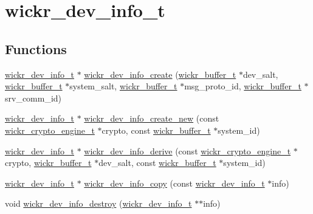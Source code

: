 \hypertarget{group__wickr__dev__info}{}\section{wickr\+\_\+dev\+\_\+info\+\_\+t}
\label{group__wickr__dev__info}
\subsection*{Functions}
\begin{DoxyCompactItemize}
\item 
\hyperlink{structwickr__dev__info}{wickr\+\_\+dev\+\_\+info\+\_\+t} $\ast$ \hyperlink{group__wickr__dev__info_gaadd5ceb4c6ed757440332e8e27109e5e}{wickr\+\_\+dev\+\_\+info\+\_\+create} (\hyperlink{structwickr__buffer}{wickr\+\_\+buffer\+\_\+t} $\ast$dev\+\_\+salt, \hyperlink{structwickr__buffer}{wickr\+\_\+buffer\+\_\+t} $\ast$system\+\_\+salt, \hyperlink{structwickr__buffer}{wickr\+\_\+buffer\+\_\+t} $\ast$msg\+\_\+proto\+\_\+id, \hyperlink{structwickr__buffer}{wickr\+\_\+buffer\+\_\+t} $\ast$srv\+\_\+comm\+\_\+id)
\item 
\hyperlink{structwickr__dev__info}{wickr\+\_\+dev\+\_\+info\+\_\+t} $\ast$ \hyperlink{group__wickr__dev__info_gadbe4731cffb188da317ed9237826ac5d}{wickr\+\_\+dev\+\_\+info\+\_\+create\+\_\+new} (const \hyperlink{structwickr__crypto__engine}{wickr\+\_\+crypto\+\_\+engine\+\_\+t} $\ast$crypto, const \hyperlink{structwickr__buffer}{wickr\+\_\+buffer\+\_\+t} $\ast$system\+\_\+id)
\item 
\hyperlink{structwickr__dev__info}{wickr\+\_\+dev\+\_\+info\+\_\+t} $\ast$ \hyperlink{group__wickr__dev__info_ga7f81b96fc222560762d608772b3f44bd}{wickr\+\_\+dev\+\_\+info\+\_\+derive} (const \hyperlink{structwickr__crypto__engine}{wickr\+\_\+crypto\+\_\+engine\+\_\+t} $\ast$crypto, \hyperlink{structwickr__buffer}{wickr\+\_\+buffer\+\_\+t} $\ast$dev\+\_\+salt, const \hyperlink{structwickr__buffer}{wickr\+\_\+buffer\+\_\+t} $\ast$system\+\_\+id)
\item 
\hyperlink{structwickr__dev__info}{wickr\+\_\+dev\+\_\+info\+\_\+t} $\ast$ \hyperlink{group__wickr__dev__info_ga1c9d2bdc1778166c49aec43906bb1a83}{wickr\+\_\+dev\+\_\+info\+\_\+copy} (const \hyperlink{structwickr__dev__info}{wickr\+\_\+dev\+\_\+info\+\_\+t} $\ast$info)
\item 
void \hyperlink{group__wickr__dev__info_ga09ee324a0e0e6a0451aa53031eecb324}{wickr\+\_\+dev\+\_\+info\+\_\+destroy} (\hyperlink{structwickr__dev__info}{wickr\+\_\+dev\+\_\+info\+\_\+t} $\ast$$\ast$info)
\end{DoxyCompactItemize}


